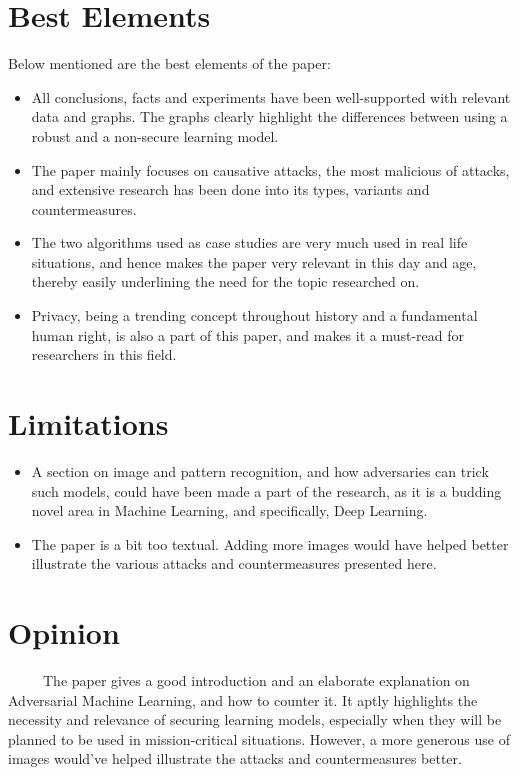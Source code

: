 \documentclass[twoside,twocolumn]{article}
\begin{document}
\section{Best Elements}
Below mentioned are the best elements of the paper:
\begin{itemize}
\item All conclusions, facts and experiments have been well-supported with relevant data and graphs. The graphs clearly highlight the differences between using a robust and a non-secure learning model.

\item The paper mainly focuses on causative attacks, the most malicious of attacks, and extensive research has been done into its types, variants and countermeasures.

\item The two algorithms used as case studies are very much used in real life situations, and hence makes the paper very relevant in this day and age, thereby easily underlining the need for the topic researched on.

\item Privacy, being a trending concept throughout history and a fundamental human right, is also a part of this paper, and makes it a must-read for researchers in this field.
\end{itemize}
%
\section{Limitations}
\begin{itemize}
\item A section on image and pattern recognition, and how adversaries can trick such models, could have been made a part of the research, as it is a budding novel area in Machine Learning, and specifically, Deep Learning.
\item The paper is a bit too textual. Adding more images would have helped better illustrate the various attacks and countermeasures presented here.
\end{itemize}
%
%
\section{Opinion}
~~~~~The paper gives a good introduction and an elaborate explanation on Adversarial Machine Learning, and how to counter it. It aptly highlights the necessity and relevance of securing learning models, especially when they will be planned to be used in mission-critical situations. However, a more generous use of images would've helped illustrate the attacks and countermeasures better.
%
\end{document}
